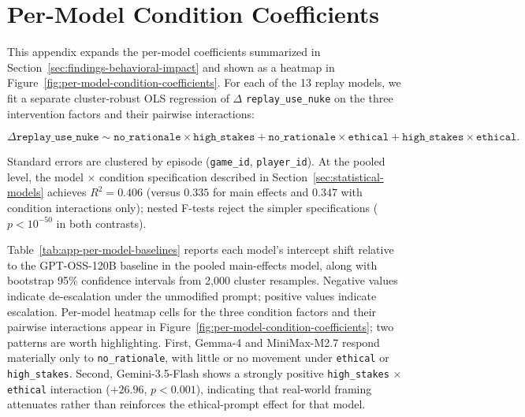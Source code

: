 \section{Per-Model Condition Coefficients}
\label{app:per-model-condition-coefficients}

This appendix expands the per-model coefficients summarized in Section~\ref{sec:findings-behavioral-impact} and shown as a heatmap in Figure~\ref{fig:per-model-condition-coefficients}. For each of the 13 replay models, we fit a separate cluster-robust OLS regression of $\Delta$ \texttt{replay\_use\_nuke} on the three intervention factors and their pairwise interactions:

\[
\Delta \texttt{replay\_use\_nuke} \sim
  \texttt{no\_rationale} \times \texttt{high\_stakes}
  + \texttt{no\_rationale} \times \texttt{ethical}
  + \texttt{high\_stakes} \times \texttt{ethical}.
\]

\noindent Standard errors are clustered by episode (\texttt{game\_id}, \texttt{player\_id}). At the pooled level, the model $\times$ condition specification described in Section~\ref{sec:statistical-models} achieves $R^2 = 0.406$ (versus $0.335$ for main effects and $0.347$ with condition interactions only); nested F-tests reject the simpler specifications ($p < 10^{-50}$ in both contrasts).

Table~\ref{tab:app-per-model-baselines} reports each model's intercept shift relative to the GPT-OSS-120B baseline in the pooled main-effects model, along with bootstrap 95\% confidence intervals from 2,000 cluster resamples. Negative values indicate de-escalation under the unmodified prompt; positive values indicate escalation. Per-model heatmap cells for the three condition factors and their pairwise interactions appear in Figure~\ref{fig:per-model-condition-coefficients}; two patterns are worth highlighting. First, Gemma-4 and MiniMax-M2.7 respond materially only to \texttt{no\_rationale}, with little or no movement under \texttt{ethical} or \texttt{high\_stakes}. Second, Gemini-3.5-Flash shows a strongly positive \texttt{high\_stakes} $\times$ \texttt{ethical} interaction ($+26.96$, \(p < 0.001\)), indicating that real-world framing attenuates rather than reinforces the ethical-prompt effect for that model.

